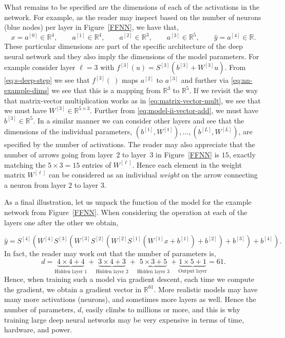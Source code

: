 \documentclass[12pt]{article}
\begin{document}
What remains to be specified are the dimensions of each of the activations in the network. For example, as the reader may inspect based on the number of neurons (blue nodes) per layer in Figure~\ref{FFNN}, we have that,
%
\begin{equation}
\label{eq:nn-example-dims}
x = a^{[0]} \in {\mathbb R}^4,
\qquad
a^{[1]} \in {\mathbb R}^4,
\qquad
a^{[2]} \in {\mathbb R}^3,
\qquad
a^{[3]} \in {\mathbb R}^5,
\qquad
\hat{y} = a^{[4]} \in {\mathbb R}.
\end{equation}
%
These particular dimensions are part of the specific architecture of the deep neural network and they also imply the dimensions of the model parameters. For example consider layer $\ell=3$ with $f^{[3]}(u) = S^{[3]}(b^{[3]} + W^{[3]} u)$. From \eqref{eq:s-deep-step} we see that $f^{[3]}(~)$ maps $a^{[2]}$ to $a^{[3]}$ and further via \eqref{eq:nn-example-dims} we see that this is a mapping from ${\mathbb R}^3$ to ${\mathbb R}^5$. If we revisit the way that matrix-vector multiplication works as in \eqref{eq:matrix-vector-mult}, we see that we must have $W^{[3]} \in {\mathbb R^{5 \times 3}}$. Further from \eqref{eq:model-ii-vector-add}, we must have $b^{[3]} \in {\mathbb R}^5$. In a similar manner we can consider other layers and see that the dimensions of the individual parameters, $(b^{[1]}, W^{[1]}), \ldots, (b^{[L]}, W^{[L]})$, are specified by the number of activations. The reader may also appreciate that the number of arrows going from layer~2 to layer~3 in Figure~\ref{FFNN} is $15$, exactly matching the $5\times 3=15$ entries of $W^{[\ell]}$. Hence each element in the weight matrix $W^{[\ell]}$ can be considered as an individual {\em weight} on the arrow connecting a neuron from layer $2$ to layer $3$.

As a final illustration, let us unpack the function of the model for the example network from Figure~\ref{FFNN}. When considering the operation at each of the layers one after the other we obtain,

\begin{equation}
\label{eqn:opened-out-example-2}
\hat{y} =S^{[4]}(W^{[4]}S^{[3]}(W^{[3]}S^{[2]}(W^{[2]}S^{[1]}(W^{[1]}x+b^{[1]})+b^{[2]}) +b^{[3]})+b^{[4]}).
\end{equation}
In fact, the reader may work out that the number of parameters is,
%
\begin{equation}
\label{eq:61-is-the-number}
d = \underbrace{4\times4 + 4}_{\text{Hidden layer 1}} + \underbrace{3\times 4 + 3}_{\text{Hidden layer 2}}+ \underbrace{5\times 3 + 5}_{\text{Hidden layer 3}}  + \underbrace{1 \times 5 +1}_{\text{Output layer}}  = 61.
\end{equation}
%
Hence, when training such a model via gradient descent, each time we compute the gradient, we obtain a gradient vector in ${\mathbb R}^{61}$. More realistic models may have many more activations (neurons), and sometimes more layers as well. Hence the number of parameters, $d$, easily climbs to millions or more, and this is why training large deep neural networks may be very expensive in terms of time, hardware, and power.
\end{document}
